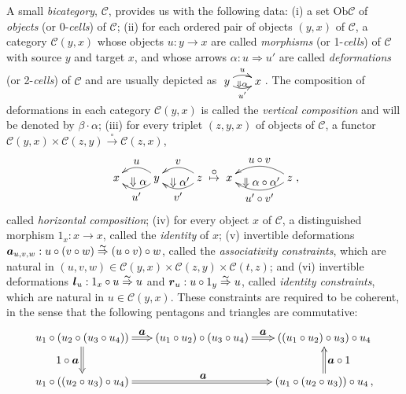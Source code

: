 \documentclass[]{amsart}
\begin{document}
 A small {\em bicategory}, ${\ensuremath{\mathcal{C}}}$, provides us with the following data: (i)  a set $\mbox{Ob}{\ensuremath{\mathcal{C}}}$ of {\em objects} (or 0-{\em cells}) of ${\ensuremath{\mathcal{C}}}$; (ii) for each ordered pair of objects $(y,x)$ of ${\ensuremath{\mathcal{C}}}$, a category ${\ensuremath{\mathcal{C}}}(y,x)$ whose objects $u:y\to x$ are called {\em morphisms} (or 1-{\em cells}) of ${\ensuremath{\mathcal{C}}}$ with source $y$ and target $x$, and whose arrows ${\alpha:u\Rightarrow u'}$  are called {\em deformations} (or 2-{\em cells}) of ${\ensuremath{\mathcal{C}}}$ and are usually depicted as $\xymatrix @C=0pc {y  \ar@/^0.5pc/[rr]^u \ar@/_0.5pc/[rr]_{u'} & {}_{\Downarrow\alpha} &x }$. The composition of deformations in each category ${\ensuremath{\mathcal{C}}}(y,x)$ is called the {\em vertical composition} and will be denoted by $\beta\cdot \alpha$; (iii) for every triplet $(z,y,x)$ of objects of ${\ensuremath{\mathcal{C}}}$, a functor ${\ensuremath{\mathcal{C}}}(y,x)\times {\ensuremath{\mathcal{C}}}(z,y)
\overset{\circ}\to {\ensuremath{\mathcal{C}}}(z,x)$,
$$\xymatrix @C=0pc{x&\   {}_{\textstyle \Downarrow\alpha} & \ar@/^0.8pc/[ll]^{\textstyle u'} \ar@/_0.8pc/[ll]_{\textstyle u} y&\ {}_{\textstyle \Downarrow\alpha'}&\ar@/^0.8pc/[ll]^{\textstyle v'} \ar@/_0.8pc/[ll]_{\textstyle v}  z}\overset{\textstyle \circ}\mapsto \xymatrix@C=0pc{x& \  {}_{\textstyle \Downarrow{\alpha\circ \alpha'}} &\ar@/^0.9pc/[ll]^{\textstyle  u'\circ v'} \ar@/_0.9pc/[ll]_{\textstyle u\circ v} z },$$ called {\em horizontal composition}; (iv) for every object $x$ of ${\ensuremath{\mathcal{C}}}$, a distinguished morphism $1_x:x\to x$, called the {\em identity} of $x$; (v) invertible deformations  $\boldsymbol{a}_{u,v,w}:u\circ(v\circ w)\overset{\thicksim}\Rightarrow (u\circ v)\circ w$, called the {\em associativity constraints}, which are natural in $(u,v,w)\in {\ensuremath{\mathcal{C}}}(y,x)\times{\ensuremath{\mathcal{C}}}(z,y)\times{\ensuremath{\mathcal{C}}}(t,z)$; and (vi) invertible deformations $\boldsymbol{l}_u: 1_x\circ u \overset{\thicksim}\Rightarrow u$ and
$\boldsymbol{r}_u:u\circ 1_y\overset{\thicksim}\Rightarrow u$, called {\em identity constraints},
which are natural in $u\in {\ensuremath{\mathcal{C}}}(y,x)$. These constraints are required to be coherent, in the sense
that the following pentagons and triangles are commutative:
\begin{equation}\label{pent}
\xymatrix@C=18pt{u_1\circ( u_2\circ (u_3\circ u_4)) \ar@2{->}[r]^{\textstyle
\boldsymbol{a}}\ar@2{->}[d]_{\textstyle 1\circ \boldsymbol{a}}&(u_1\circ u_2)\circ (u_3\circ u_4
)\ar@2{->}[r]^{\textstyle \boldsymbol{a}}& ((u_1\circ u_2)\circ u_3)\circ u_4
\\ u_1\circ ((u_2\circ u_3)\circ u_4)\ar@2{->}[rr]^{\textstyle \boldsymbol{a}}&&(u_1\circ(u_2\circ u_3))\circ u_4\,,\ar@2{->}[u]_{\textstyle \boldsymbol{a}\circ 1}}\end{equation}
\end{document}
